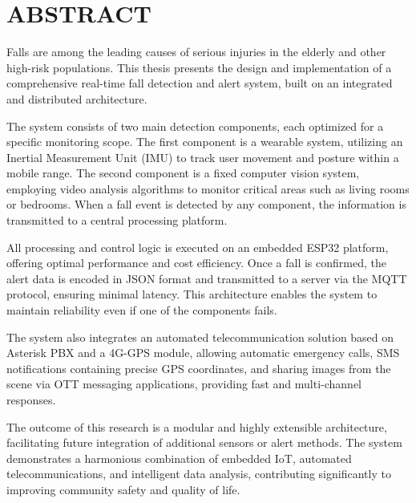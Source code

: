 
\chapter*{ABSTRACT}

Falls are among the leading causes of serious injuries in the elderly and other high-risk populations. This thesis presents the design and implementation of a comprehensive real-time fall detection and alert system, built on an integrated and distributed architecture.

The system consists of two main detection components, each optimized for a specific monitoring scope. The first component is a wearable system, utilizing an Inertial Measurement Unit (IMU) to track user movement and posture within a mobile range. The second component is a fixed computer vision system, employing video analysis algorithms to monitor critical areas such as living rooms or bedrooms. When a fall event is detected by any component, the information is transmitted to a central processing platform.

All processing and control logic is executed on an embedded ESP32 platform, offering optimal performance and cost efficiency. Once a fall is confirmed, the alert data is encoded in JSON format and transmitted to a server via the MQTT protocol, ensuring minimal latency. This architecture enables the system to maintain reliability even if one of the components fails.

The system also integrates an automated telecommunication solution based on Asterisk PBX and a 4G-GPS module, allowing automatic emergency calls, SMS notifications containing precise GPS coordinates, and sharing images from the scene via OTT messaging applications, providing fast and multi-channel responses.

The outcome of this research is a modular and highly extensible architecture, facilitating future integration of additional sensors or alert methods. The system demonstrates a harmonious combination of embedded IoT, automated telecommunications, and intelligent data analysis, contributing significantly to improving community safety and quality of life.
